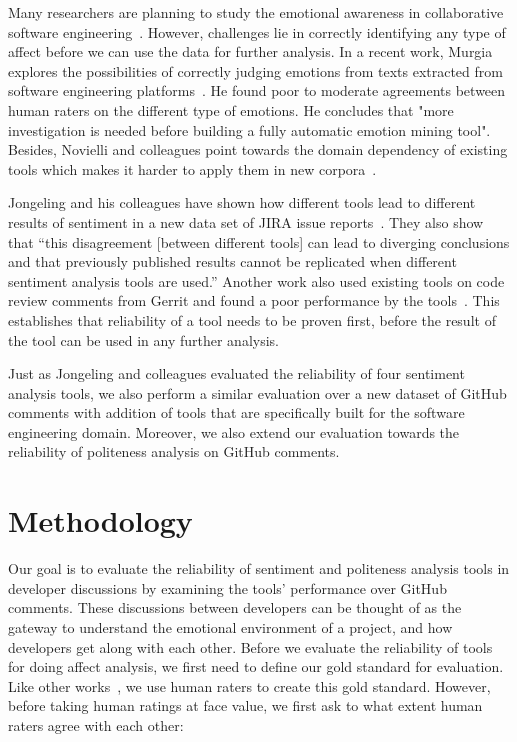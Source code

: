 Many researchers are planning to study 
the emotional awareness in collaborative software engineering~\cite{dewan2015towards}. 
However, challenges lie in correctly identifying any type of affect before we can use the data for further analysis. 
In a recent work, Murgia explores the possibilities of correctly judging emotions from texts extracted from software engineering platforms~\cite{murgia2014developers}. 
He found 
poor to moderate agreements between human raters 
on the different type of emotions. 
He concludes that 
"more investigation is needed before 
building a fully automatic emotion mining tool". 
Besides, Novielli and colleagues point towards 
the domain dependency of existing tools 
which makes it harder to apply them in new corpora~\cite{novielli2015challenges}. 

Jongeling and his colleagues have shown 
how different tools lead to different results of sentiment 
in a new data set of JIRA issue reports~\cite{jongeling2017negative}. They also show that ``this disagreement [between different tools] 
can lead to diverging conclusions 
and that previously published results cannot be replicated 
when different sentiment analysis tools are used.'' 
Another work also used existing tools 
on code review comments from Gerrit 
and found a poor performance by the tools~\cite{ahmed2017senticr}. This establishes that reliability of a tool needs to be proven first, before the result of the tool can be used in any further analysis.

Just as Jongeling and colleagues 
evaluated the reliability of four sentiment analysis tools, 
we also perform a similar evaluation 
over a new dataset of GitHub comments 
with addition of tools 
that are specifically built for the software engineering domain. Moreover, we also extend our evaluation 
towards the reliability of politeness analysis 
on GitHub comments.  
   

\section{Methodology}

Our goal is to evaluate the reliability of sentiment and politeness analysis tools in developer discussions by examining the tools' performance over GitHub comments.
These discussions between developers can be thought of as the gateway to understand the emotional environment of a project, and how developers get along with each other. 
Before we evaluate the reliability of tools for doing affect analysis,
we first need to define our gold standard for evaluation.
Like other works~\cite{calefato2017sentiment,ahmed2017senticr}, we use human raters to create
this gold standard.
However, before taking human ratings at face value, we first ask
to what extent human raters agree with each other:

